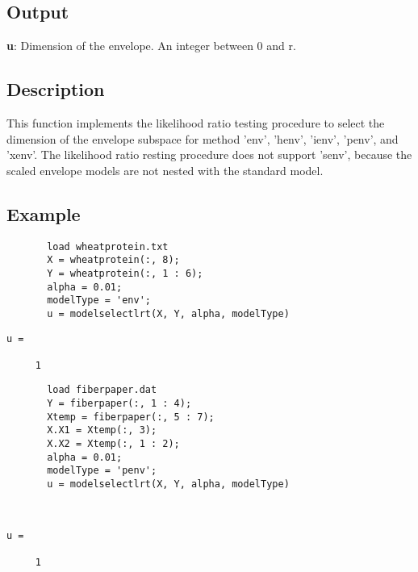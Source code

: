\documentclass[a4paper,11pt,openany]{memoir}
\begin{document}
\subsection*{Output}

\begin{par}
\textbf{u}: Dimension of the envelope. An integer between 0 and r.
\end{par} \vspace{1em}


\subsection*{Description}

\begin{par}
This function implements the likelihood ratio testing procedure to select the dimension of the envelope subspace for method 'env', 'henv', 'ienv', 'penv', and 'xenv'.  The likelihood ratio resting procedure does not support 'senv', because the scaled envelope models are not nested with the standard model.
\end{par} \vspace{1em}


\subsection*{Example}


\begin{verbatim}       load wheatprotein.txt
       X = wheatprotein(:, 8);
       Y = wheatprotein(:, 1 : 6);
       alpha = 0.01;
       modelType = 'env';
       u = modelselectlrt(X, Y, alpha, modelType)\end{verbatim}
            \color{lightgray}\ttfamily \begin{verbatim}
u =

     1
\end{verbatim} \rmfamily
\color{black}
\begin{verbatim}       load fiberpaper.dat
       Y = fiberpaper(:, 1 : 4);
       Xtemp = fiberpaper(:, 5 : 7);
       X.X1 = Xtemp(:, 3);
       X.X2 = Xtemp(:, 1 : 2);
       alpha = 0.01;
       modelType = 'penv';
       u = modelselectlrt(X, Y, alpha, modelType)\end{verbatim}
    


        \color{lightgray}\ttfamily \begin{verbatim}


u =

     1

\end{verbatim} \rmfamily
\color{black}
    
\end{document}
